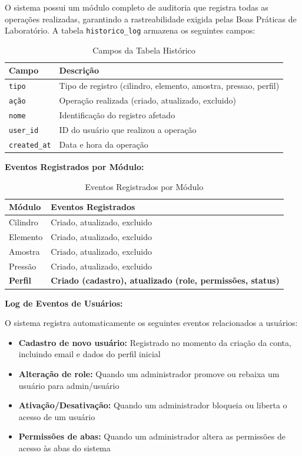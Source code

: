 \documentclass[12pt,a4paper]{article}
\begin{document}
O sistema possui um módulo completo de auditoria que registra todas as operações realizadas, garantindo a rastreabilidade exigida pelas Boas Práticas de Laboratório. A tabela \texttt{historico\_log} armazena os seguintes campos:

\begin{table}[h!]
\centering
\caption{Campos da Tabela Histórico}
\label{tab:historico-campos}
\begin{tabular}{@{}ll@{}}
\toprule
\textbf{Campo} & \textbf{Descrição} \\
\midrule
\texttt{tipo} & Tipo de registro (cilindro, elemento, amostra, pressao, perfil) \\
\texttt{ação} & Operação realizada (criado, atualizado, excluido) \\
\texttt{nome} & Identificação do registro afetado \\
\texttt{user\_id} & ID do usuário que realizou a operação \\
\texttt{created\_at} & Data e hora da operação \\
\bottomrule
\end{tabular}
\end{table}

\textbf{Eventos Registrados por Módulo:}

\begin{table}[h!]
\centering
\caption{Eventos Registrados por Módulo}
\label{tab:eventos-modulo}
\begin{tabular}{@{}ll@{}}
\toprule
\textbf{Módulo} & \textbf{Eventos Registrados} \\
\midrule
Cilindro & Criado, atualizado, excluido \\
Elemento & Criado, atualizado, excluido \\
Amostra & Criado, atualizado, excluido \\
Pressão & Criado, atualizado, excluido \\
\textbf{Perfil} & \textbf{Criado (cadastro), atualizado (role, permissões, status)} \\
\bottomrule
\end{tabular}
\end{table}

\textbf{Log de Eventos de Usuários:}

O sistema registra automaticamente os seguintes eventos relacionados a usuários:

\begin{itemize}
\item \textbf{Cadastro de novo usuário:} Registrado no momento da criação da conta, incluindo email e dados do perfil inicial
\item \textbf{Alteração de role:} Quando um administrador promove ou rebaixa um usuário para admin/usuário
\item \textbf{Ativação/Desativação:} Quando um administrador bloqueia ou liberta o acesso de um usuário
\item \textbf{Permissões de abas:} Quando um administrador altera as permissões de acesso às abas do sistema
\end{itemize}
\end{document}
